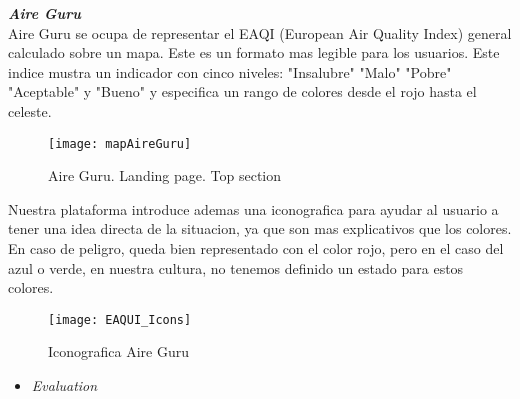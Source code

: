 \noindent\textbf{\textit{Aire Guru} }\\


Aire Guru se ocupa de representar el EAQI (European Air Quality Index) general calculado sobre un mapa. Este es un formato mas legible para los usuarios.
Este indice mustra un indicador con cinco niveles: "Insalubre" "Malo" "Pobre" "Aceptable" y "Bueno" y especifica un rango de colores desde el rojo hasta el celeste.

\begin{figure}[ht]
    \centering
    \texttt{[image: mapAireGuru]}
    \caption{Aire Guru. Landing page. Top section}
\end{figure}
Nuestra plataforma introduce ademas una iconografica para ayudar al usuario a tener una idea directa de la situacion, ya que son mas 
explicativos que los colores. En caso de peligro, queda bien representado con el color rojo, pero en el caso del azul o verde, en nuestra cultura, no
tenemos definido un estado para estos colores.
\begin{figure}[ht]
    \centering
    \texttt{[image: EAQUI\_Icons]}
    \caption{Iconografica Aire Guru}
\end{figure}
\newpage
\begin{itemize}
    \item \textit{Evaluation}
\end{itemize}
